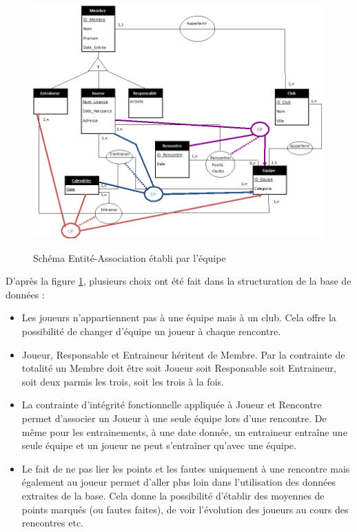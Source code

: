 \documentclass[a4paper»,8pt,french,fleqn]{report}
\begin{document}
\begin{figure}[h]
  \centering
    \includegraphics[scale=0.7]{Schema_EA.png}
    \label{fig:schema_ea}
    \caption{Schéma Entité-Association établi par l'équipe}
\end{figure}

D'après la figure \ref{fig:schema_ea}, plusieurs choix ont été fait dans la structuration de la base de données : \\

\begin{itemize}

\item Les joueurs n'appartiennent pas à une équipe mais à un club. Cela offre la possibilité de changer d'équipe un joueur à chaque rencontre. \\

\item Joueur, Responsable et Entraineur héritent de Membre. Par la contrainte de totalité un Membre doit être soit Joueur soit Responsable soit Entraineur, soit deux parmis les trois, soit les trois à la fois.\\

\item La contrainte d'intégrité fonctionnelle appliquée à Joueur et Rencontre permet d'associer un Joueur à une seule équipe lors d'une rencontre. De même pour les entrainements, à une date donnée, un entraineur entraîne une seule équipe et un joueur ne peut s'entraîner qu'avec une équipe. \\

\item Le fait de ne pas lier les points et les fautes uniquement à une rencontre mais également au joueur permet d'aller plus loin dans l'utilisation des données extraites de la base. Cela donne la possibilité d'établir des moyennes de points marqués (ou fautes faites), de voir l'évolution des joueurs au cours des rencontres etc.

\end{itemize}
\end{document}
